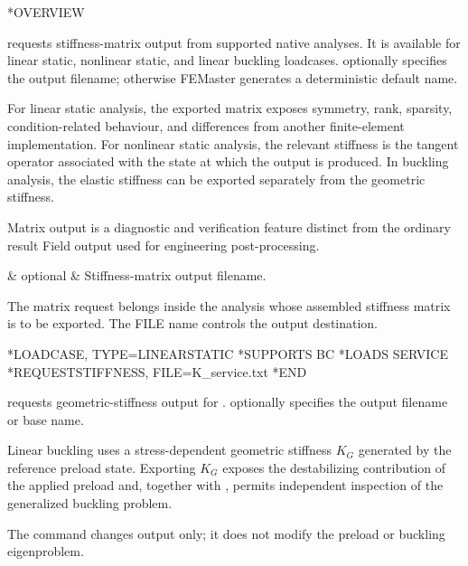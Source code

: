 \exampleheading
\begin{inputdeck}
*OVERVIEW
\end{inputdeck}


 requests stiffness-matrix output from supported native analyses. It is available for linear static, nonlinear static, and linear buckling loadcases.  optionally specifies the output filename; otherwise FEMaster generates a deterministic default name.

For linear static analysis, the exported matrix exposes symmetry, rank, sparsity, condition-related behaviour, and differences from another finite-element implementation. For nonlinear static analysis, the relevant stiffness is the tangent operator associated with the state at which the output is produced. In buckling analysis, the elastic stiffness can be exported separately from the geometric stiffness.

Matrix output is a diagnostic and verification feature distinct from the ordinary result Field output used for engineering post-processing.

\begin{keywordparameters}
 & optional & Stiffness-matrix output filename. \\
\end{keywordparameters}

The matrix request belongs inside the analysis whose assembled stiffness matrix is to be exported. The FILE name controls the output destination.

\exampleheading
\begin{inputdeck}
*LOADCASE, TYPE=LINEARSTATIC
*SUPPORTS
BC
*LOADS
SERVICE
*REQUESTSTIFFNESS, FILE=K_service.txt
*END
\end{inputdeck}


 requests geometric-stiffness output for .  optionally specifies the output filename or base name.

Linear buckling uses a stress-dependent geometric stiffness \(K_G\) generated by the reference preload state. Exporting \(K_G\) exposes the destabilizing contribution of the applied preload and, together with , permits independent inspection of the generalized buckling problem.

The command changes output only; it does not modify the preload or buckling eigenproblem.

